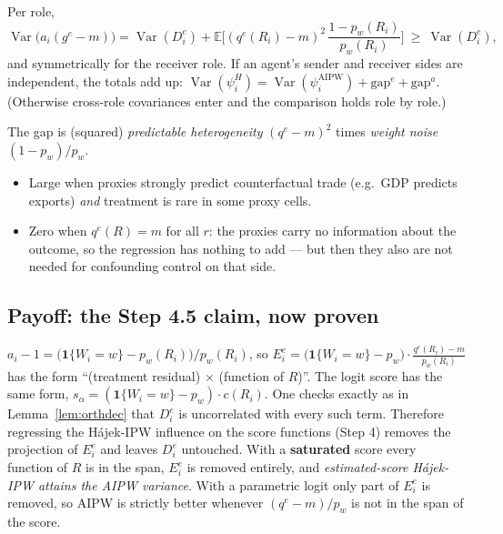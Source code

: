 \documentclass[11pt,a4paper]{article}
\theoremstyle{remark}
\newcommand{\E}{\mathbb{E}}
\newcommand{\Var}{\operatorname{Var}}
\newcommand{\1}{\mathbf{1}}
\newcommand{\qe}{q^{e}}
\newcommand{\gE}{g^{e}}
\begin{document}
\begin{resultbox}
Per role,
\[
\Var\big(a_i(\gE-m)\big)=\Var(D^e_i)+\E\Big[(\qe(R_i)-m)^2\,\frac{1-p_w(R_i)}{p_w(R_i)}\Big]\ \geq\ \Var(D^e_i),
\]
and symmetrically for the receiver role. If an agent's sender and receiver sides are independent, the totals add up:
$\Var(\psi^{H}_i)=\Var(\psi^{\mathrm{AIPW}}_i)+\text{gap}^e+\text{gap}^a$. (Otherwise cross-role covariances enter and the comparison holds role by role.)
\end{resultbox}

\begin{intuitionbox}
The gap is (squared) \emph{predictable heterogeneity} $(\qe-m)^2$ times \emph{weight noise} $(1-p_w)/p_w$.
\begin{itemize}[leftmargin=*,nosep]
\item Large when proxies strongly predict counterfactual trade (e.g.\ GDP predicts exports) \emph{and} treatment is rare in some proxy cells.
\item Zero when $\qe(R)=m$ for all $r$: the proxies carry no information about the outcome, so the regression has nothing to add --- but then they also are not needed for confounding control on that side.
\end{itemize}
\end{intuitionbox}

\subsection*{Payoff: the Step 4.5 claim, now proven}
$a_i-1=\big(\1\{W_i=w\}-p_w(R_i)\big)/p_w(R_i)$, so $E^e_i=\big(\1\{W_i=w\}-p_w\big)\cdot\frac{\qe(R_i)-m}{p_w(R_i)}$ has the form ``(treatment residual) $\times$ (function of $R$)''. The logit score has the same form, $s_\alpha=(\1\{W_i=w\}-p_w)\cdot c(R_i)$. One checks exactly as in Lemma~\ref{lem:orthdec} that $D^e_i$ is uncorrelated with every such term. Therefore regressing the Hájek-IPW influence on the score functions (Step 4) removes the projection of $E^e_i$ and leaves $D^e_i$ untouched. With a \textbf{saturated} score every function of $R$ is in the span, $E^e_i$ is removed entirely, and \emph{estimated-score Hájek-IPW attains the AIPW variance}. With a parametric logit only part of $E^e_i$ is removed, so AIPW is strictly better whenever $(\qe-m)/p_w$ is not in the span of the score.
\end{document}
